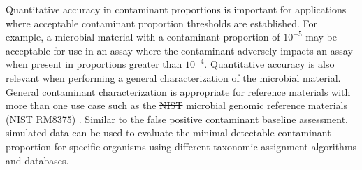 \documentclass[fleqn,10pt,lineno]{wlpeerj}\usepackage[]{graphicx}\usepackage[]{color}
\providecommand{\DIFdeltex}[1]{{\protect\color{red}\sout{#1}}}                      %
\providecommand{\DIFaddend}{} %
\providecommand{\DIFdelbegin}{} %
\providecommand{\DIFdelend}{} %
\providecommand{\DIFdel}[1]{\texorpdfstring{\DIFdeltex{#1}}{}} %
\begin{document}
\DIFaddend Quantitative accuracy in contaminant proportions is important for applications where acceptable contaminant proportion thresholds are established.
For example, a microbial material with a contaminant proportion of $10^{-5}$ may be acceptable for use in an assay where the contaminant adversely impacts an assay when present in proportions greater than $10^{-4}$.
Quantitative accuracy is also relevant when performing a general characterization of the microbial material.
General contaminant characterization is appropriate for reference materials with more than one use case such as the \DIFdelbegin \DIFdel{NIST }\DIFdelend microbial genomic reference materials (NIST RM8375) \citep{olson2016pepr}.
Similar to the false positive contaminant baseline assessment,
simulated data can be used to evaluate the minimal detectable contaminant proportion for specific organisms using different taxonomic assignment algorithms and databases.
\DIFdelbegin %
\end{document}
